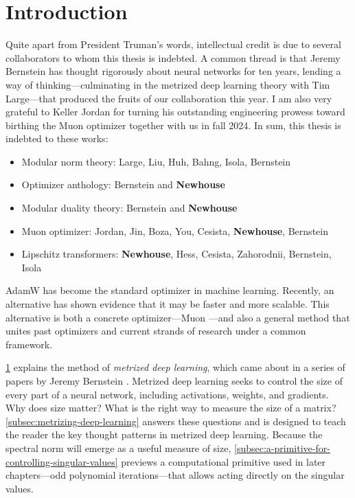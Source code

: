 \chapter{Introduction}
\label{sec:intro}

\begin{notebox}
Quite apart from President Truman's words, intellectual credit is due to several collaborators to whom this thesis is indebted. A common thread is that Jeremy Bernstein has thought rigorously about neural networks for ten years, lending a way of thinking---culminating in the metrized deep learning theory with Tim Large---that produced the fruits of our collaboration this year. I am also very grateful to Keller Jordan for turning his outstanding engineering prowess toward birthing the Muon optimizer together with us in fall 2024. In sum, this thesis is indebted to these works:
\begin{itemize}
    \item Modular norm theory: Large, Liu, Huh, Bahng, Isola, Bernstein
    \item Optimizer anthology: Bernstein and \textbf{Newhouse}
    \item Modular duality theory: Bernstein and \textbf{Newhouse}
    \item Muon optimizer: Jordan, Jin, Boza, You, Cesista, \textbf{Newhouse}, Bernstein
    \item Lipschitz transformers: \textbf{Newhouse}, Hess, Cesista, Zahorodnii, Bernstein, Isola
\end{itemize}
\end{notebox}

\vspace{0.5em}

AdamW \citep{loshchilov2019adamw} has become the standard optimizer in machine learning. Recently, an alternative has shown evidence that it may be faster and more scalable. This alternative is both a concrete optimizer---Muon \citep{jordan2024muon,liu2025muonscalablellmtraining,shah2025muonpretraining}---and also a general method that unites past optimizers and current strands of research under a common framework.

\cref{sec:intro} explains the method of \textit{metrized deep learning}, which came about in a series of papers by Jeremy Bernstein \citep{bernstein2021distanceneuralnetworksstability,bernstein2022optimisationgeneralisationnetworks, spectral-condition}. Metrized deep learning seeks to control the size of every part of a neural network, including activations, weights, and gradients. Why does size matter? What is the right way to measure the size of a matrix? \cref{subsec:metrizing-deep-learning} answers these questions and is designed to teach the reader the key thought patterns in metrized deep learning. Because the spectral norm will emerge as a useful measure of size, \cref{subsec:a-primitive-for-controlling-singular-values} previews a computational primitive used in later chapters---odd polynomial iterations---that allows acting directly on the singular values.

